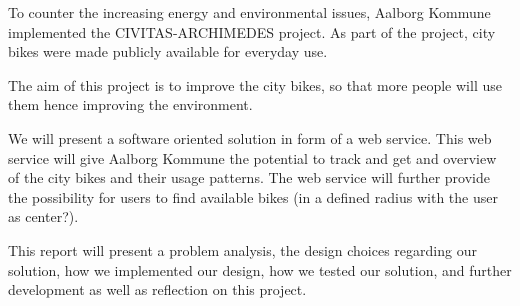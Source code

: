 To counter the increasing energy and environmental issues, Aalborg Kommune implemented the CIVITAS-ARCHIMEDES project\cite{aalborgbycyklenbagcyklen}. As part of the project, city bikes were made publicly available for everyday use.

The aim of this project is to improve the city bikes, so that more people will use them hence improving the environment.

We will present a software oriented solution in form of a web service. This web service will give Aalborg Kommune the potential to track and get and overview of the city bikes and their usage patterns. The web service will further provide the possibility for users to find available bikes (in a defined radius with the user as center?).

This report will present a problem analysis, the design choices regarding our solution, how we implemented our design, how we tested our solution, and further development as well as reflection on this project.




